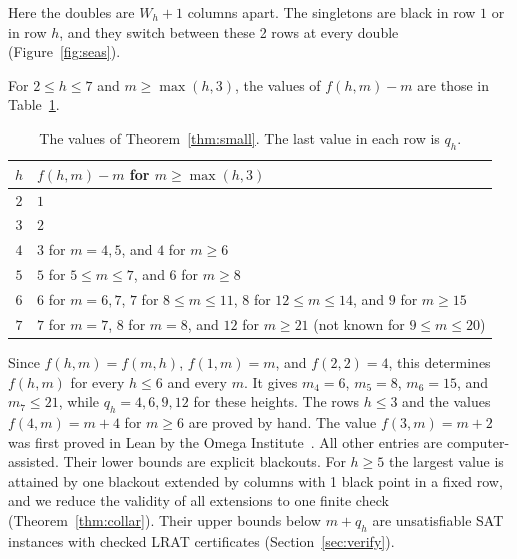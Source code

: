 Here the doubles are $W_h+1$ columns apart. The singletons are black in row $1$ or in
row $h$, and they switch between these 2 rows at every double (Figure~\ref{fig:seas}).

\begin{theorem}\label{thm:small}
For $2\le h\le7$ and $m\ge\max(h,3)$, the values of $f(h,m)-m$ are those in
Table~\ref{tab:values}.
\end{theorem}

\begin{table}[ht]
\centering
\begin{tabular}{@{}cl@{}}
\toprule
$h$ & $f(h,m)-m$ for $m\ge\max(h,3)$\\
\midrule
$2$ & $1$\\
$3$ & $2$\\
$4$ & $3$ for $m=4,5$, and $4$ for $m\ge6$\\
$5$ & $5$ for $5\le m\le7$, and $6$ for $m\ge8$\\
$6$ & $6$ for $m=6,7$, $7$ for $8\le m\le11$, $8$ for $12\le m\le14$, and $9$ for
$m\ge15$\\
$7$ & $7$ for $m=7$, $8$ for $m=8$, and $12$ for $m\ge21$ (not known for $9\le m\le20$)\\
\bottomrule
\end{tabular}
\caption{The values of Theorem~\ref{thm:small}. The last value in each row is $q_h$.}
\label{tab:values}
\end{table}

Since $f(h,m)=f(m,h)$, $f(1,m)=m$, and $f(2,2)=4$, this determines $f(h,m)$ for every
$h\le6$ and every $m$. It gives $m_4=6$, $m_5=8$, $m_6=15$, and $m_7\le21$, while
$q_h=4,6,9,12$ for these heights. The rows $h\le3$ and the values $f(4,m)=m+4$ for $m\ge6$
are proved by hand. The value $f(3,m)=m+2$ was first proved in Lean by the Omega
Institute~\cite{trureturing2026}. All other entries are computer-assisted. Their lower
bounds are explicit blackouts. For $h\ge5$ the largest value is attained by one blackout
extended by columns with 1 black point in a fixed row, and we reduce the validity of all
extensions to one finite check (Theorem~\ref{thm:collar}). Their
upper bounds below $m+q_h$ are unsatisfiable SAT instances with checked LRAT certificates
(Section~\ref{sec:verify}).

